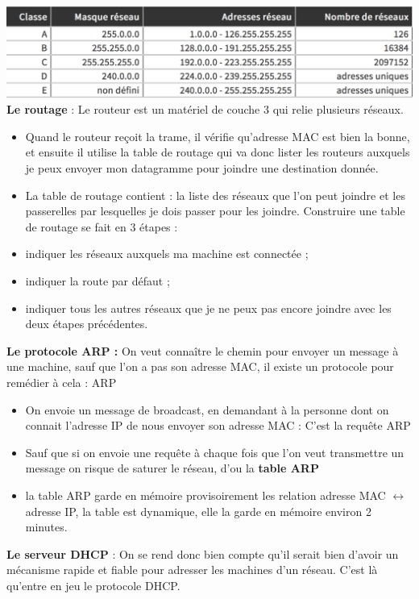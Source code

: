 \documentclass[a4paper,9pt, twocolumn]{article}
\begin{document}
\includegraphics[scale=0.38]{masq.png}
\textbf{Le routage} : Le routeur est un matériel de couche 3 qui relie plusieurs réseaux.
\begin{itemize}
\item Quand le routeur reçoit la trame, il vérifie qu'adresse MAC est bien la bonne, et ensuite il utilise la table de routage qui va donc lister les routeurs auxquels je peux envoyer mon datagramme pour joindre une destination donnée.
\item La table de routage contient : la liste des réseaux que l'on peut joindre et les passerelles par lesquelles je dois passer pour les joindre. Construire une table de routage se fait en 3 étapes :
\item indiquer les réseaux auxquels ma machine est connectée ;
\item indiquer la route par défaut ;
\item indiquer tous les autres réseaux que je ne peux pas encore joindre avec les deux étapes précédentes.
\end{itemize}
\textbf{Le protocole ARP :} On veut connaître le chemin pour envoyer un message à une machine, sauf que l'on a pas son adresse MAC, il existe un protocole pour remédier à cela : ARP
\begin{itemize}
\item On envoie un message de broadcast, en demandant à la personne dont on connait l'adresse IP de nous envoyer son adresse MAC : C'est la requête ARP
\item Sauf que si on envoie une requête à chaque fois que l'on veut transmettre un message on risque de saturer le réseau, d'ou la \textbf{table ARP}
\item la table ARP garde en mémoire provisoirement les relation adresse MAC $\longleftrightarrow$ adresse IP, la table est dynamique, elle la garde en mémoire environ 2 minutes.
\end{itemize}
\textbf{Le serveur DHCP} : On se rend donc bien compte qu'il serait bien d'avoir un mécanisme rapide et fiable pour adresser les machines d'un réseau. C'est là qu'entre en jeu le protocole DHCP.
\end{document}
